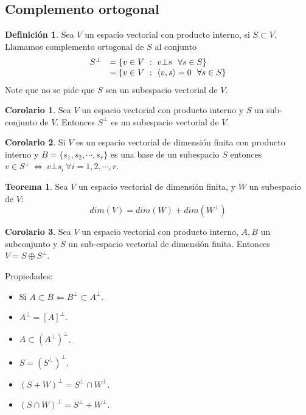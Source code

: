 \documentclass[10pt]{article}
\theoremstyle{definition}
\newtheorem{definition}{Definición}[section]
\newtheorem{theorem}{Teorema}[section]
\newtheorem{corollary}{Corolario}[theorem]
\begin{document}
\subsection{Complemento ortogonal}
\begin{definition}
    Sea $V$ un espacio vectorial con producto interno, si $S\subset V$. Llamamos complemento ortogonal de $S$ al conjunto $$\begin{array}{ c l }
S^{\bot } & =\{v\in V\ :\ v\bot s\ \ \forall s\in S\}\\
 & =\{v\in V\ :\ \langle v,s\rangle =0\ \ \forall s\in S\}
\end{array}$$
Note que no se pide que $S$ sea un subespacio vectorial de $V$.
\end{definition}
\begin{corollary}
    Sea $V$ un espacio vectorial con producto interno y $S$ un sub-conjunto de $V$. Entonces $S^\bot$ es un subespacio vectorial de $V$.
\end{corollary}
\begin{corollary}
    Si $V$ es un espacio vectorial de dimensión finita con producto interno y $B=\{s_1,s_2,\cdots,s_r\}$ es una base de un subespacio $S$ entonces $v\in S^\bot\ \Leftrightarrow\ v\bot s_i\ \forall i=1,2,\cdots,r$.
\end{corollary}
\begin{theorem}
    Sea $V$ un espacio vectorial de dimensión finita, y $W$ un subespacio de $V$:$$dim(V)=dim(W)+dim(W^\bot)$$
\end{theorem}
\begin{corollary}
    Sea $V$ un espacio vectorial con producto interno, $A, B$ un subconjunto y $S$ un sub-espacio vectorial de dimensión finita. Entonces $V=S\oplus S^\bot$.
\end{corollary}
Propiedades:
\begin{itemize}
    \item Si $A\subset B \Leftarrow B^\bot \subset A^\bot$.
    \item $A^\bot = [A]^\bot$.
    \item $A\subset (A^\bot)^\bot$.
    \item $S=(S^\bot)^\bot$.
    \item $(S+W)^\bot =S^\bot \cap W^\bot$.
    \item $(S\cap W)^\bot = S^\bot + W^\bot$.
\end{itemize}
\end{document}
